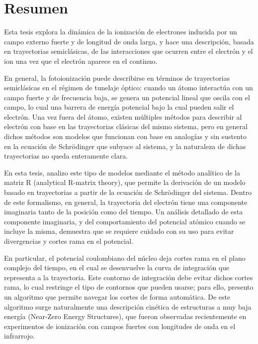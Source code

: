 \chapter*{Resumen}

Esta tesis explora la dinámica de la ionización de electrones inducida por un campo externo fuerte y de longitud de onda larga, y hace una descripción, basada en trayectorias semiclásicas, de las interacciones que ocurren entre el electrón y el ion una vez que el electrón aparece en el continuo.

\vspace{\abstskip}
\noindent
En general, la fotoionización puede describirse en términos de trayectorias semiclásicas en el régimen de tunelaje óptico: cuando un átomo interactúa con un campo fuerte y de frecuencia baja, se genera un potencial lineal que oscila con el campo, lo cual una barrera de energía potencial bajo la cual pueden salir el electrón. Una vez fuera del átomo, existen múltiples métodos para describir al electrón con base en las trayectorias clásicas del mismo sistema, pero en general dichos métodos son modelos que funcionan con base en analogías y sin sustento en la ecuación de Schrödinger que subyace al sistema, y la naturaleza de dichas trayectorias no queda enteramente clara.

\vspace{\abstskip}
\noindent
En esta tesis, analizo este tipo de modelos mediante el método analítico de la matriz R (analytical R-matrix theory), que permite la derivación de un modelo basado en trayectorias a partir de la ecuación de Schrödinger del sistema. Dentro de este formalismo, en general, la trayectoria del electrón tiene una componente imaginaria tanto de la posición como del tiempo. Un análisis detallado de esta componente imaginaria, y del comportamiento del potencial atómico cuando se incluye la misma, demuestra que se requiere cuidado con su uso para evitar divergencias y cortes rama en el potencial. 

\vspace{\abstskip}
\noindent
En particular, el potencial coulombiano del núcleo deja cortes rama en el plano complejo del tiempo, en el cual se desenvuelve la curva de integración que representa a la trayectoria. Este contorno de integración debe evitar dichos cortes rama, lo cual restringe el tipo de contornos que pueden usarse; para ello, presento un algoritmo que permite navegar los cortes de forma automática. De este algoritmo surge naturalmente una descripción cinética de estructuras a muy baja energía (Near-Zero Energy Structures), que fueron observadas recientemente en experimentos de ionización con campos fuertes con longitudes de onda en el infrarrojo.

